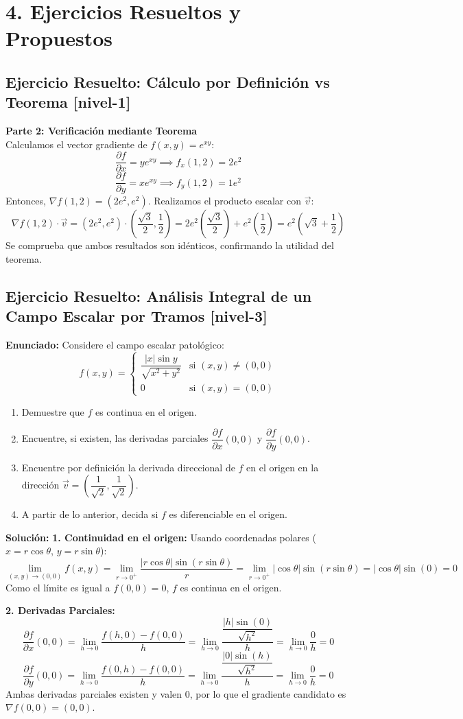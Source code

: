 \documentclass[11pt]{article}
\newenvironment{ejercicios}{%
  \section*{4. Ejercicios Resueltos y Propuestos}%
}{}
\newenvironment{ejercicioresuelto}[2]{\subsection*{Ejercicio Resuelto: #1 \small{[#2]}}}{}
\newcommand{\enunciado}[1]{\textbf{Enunciado:} #1\par\vspace{0.2cm}}
\newcommand{\solucion}[1]{\textbf{Solución:} #1\par\vspace{0.4cm}}
\begin{document}
\begin{ejercicios}
\begin{ejercicioresuelto}{Cálculo por Definición vs Teorema}{nivel-1}
{      \textbf{Parte 2: Verificación mediante Teorema} \\
      Calculamos el vector gradiente de $f(x,y) = e^{xy}$:
      $$ \dfrac{\partial f}{\partial x} = y e^{xy} \implies f_x(1,2) = 2e^2 $$
      $$ \dfrac{\partial f}{\partial y} = x e^{xy} \implies f_y(1,2) = 1e^2 $$
      Entonces, $\nabla f(1,2) = (2e^2, e^2)$. Realizamos el producto escalar con $\vec{v}$:
      $$ \nabla f(1,2) \cdot \vec{v} = (2e^2, e^2) \cdot \left( \dfrac{\sqrt{3}}{2}, \dfrac{1}{2} \right) = 2e^2\left(\dfrac{\sqrt{3}}{2}\right) + e^2\left(\dfrac{1}{2}\right) = e^2 \left( \sqrt{3} + \dfrac{1}{2} \right) $$
      Se comprueba que ambos resultados son idénticos, confirmando la utilidad del teorema.
    }
  \end{ejercicioresuelto}

  \begin{ejercicioresuelto}{Análisis Integral de un Campo Escalar por Tramos}{nivel-3}
    \enunciado{
      Considere el campo escalar patológico:
      $$ f(x,y) = \begin{cases} \dfrac{|x|\sin y}{\sqrt{x^2 + y^2}} & \text{si } (x,y) \neq (0,0) \\[1em] 0 & \text{si } (x,y) = (0,0) \end{cases} $$
      \begin{enumerate}
        \item Demuestre que $f$ es continua en el origen.
        \item Encuentre, si existen, las derivadas parciales $\dfrac{\partial f}{\partial x}(0,0)$ y $\dfrac{\partial f}{\partial y}(0,0)$.
        \item Encuentre por definición la derivada direccional de $f$ en el origen en la dirección $\vec{v} = \left(\dfrac{1}{\sqrt{2}}, \dfrac{1}{\sqrt{2}}\right)$.
        \item A partir de lo anterior, decida si $f$ es diferenciable en el origen.
      \end{enumerate}
    }
    \solucion{
      \textbf{1. Continuidad en el origen:}
      Usando coordenadas polares ($x = r\cos\theta$, $y = r\sin\theta$):
      $$ \lim\limits_{(x,y) \to (0,0)} f(x,y) = \lim\limits_{r \to 0^+} \dfrac{|r\cos\theta| \sin(r\sin\theta)}{r} = \lim\limits_{r \to 0^+} |\cos\theta| \sin(r\sin\theta) = |\cos\theta| \sin(0) = 0 $$
      Como el límite es igual a $f(0,0)=0$, $f$ es continua en el origen.

      \vspace{0.2cm}
      \textbf{2. Derivadas Parciales:}
      $$ \dfrac{\partial f}{\partial x}(0,0) = \lim\limits_{h \to 0} \dfrac{f(h,0) - f(0,0)}{h} = \lim\limits_{h \to 0} \dfrac{\dfrac{|h|\sin(0)}{\sqrt{h^2}}}{h} = \lim\limits_{h \to 0} \dfrac{0}{h} = 0 $$
      $$ \dfrac{\partial f}{\partial y}(0,0) = \lim\limits_{h \to 0} \dfrac{f(0,h) - f(0,0)}{h} = \lim\limits_{h \to 0} \dfrac{\dfrac{|0|\sin(h)}{\sqrt{h^2}}}{h} = \lim\limits_{h \to 0} \dfrac{0}{h} = 0 $$
      Ambas derivadas parciales existen y valen 0, por lo que el gradiente candidato es $\nabla f(0,0) = (0,0)$.

}
\end{ejercicioresuelto}
\end{ejercicios}
\end{document}
